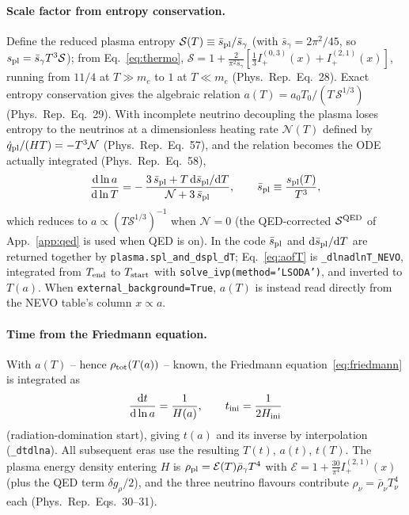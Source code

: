 \documentclass[11pt,a4paper]{article}
\newcommand{\dd}{\mathrm{d}}
\newcommand{\code}[1]{\texttt{#1}}
\newcommand{\PR}{Phys.\ Rep.}
\begin{document}
\paragraph{Scale factor from entropy conservation.}
Define the reduced plasma entropy $\mathcal{S}(T)\equiv\bar s_{\rm pl}/\bar
s_\gamma$ (with $\bar s_\gamma=2\pi^2/45$, so $s_{\rm pl}=\bar s_\gamma T^3
\mathcal{S}$); from Eq.~\eqref{eq:thermo}, $\mathcal{S}=1+\frac{2}{\pi^2\bar
s_\gamma}[\tfrac13 I^{(0,3)}_+(x)+I^{(2,1)}_+(x)]$, running from $11/4$ at $T\gg
m_e$ to $1$ at $T\ll m_e$ (\PR\ Eq.~28). Exact entropy conservation gives the
algebraic relation $a(T)=a_0T_0/(T\,\mathcal{S}^{1/3})$ (\PR\ Eq.~29). With
incomplete neutrino decoupling the plasma loses entropy to the neutrinos at a
dimensionless heating rate $\mathcal{N}(T)$ defined by $\dot q_{\rm pl}/(HT)=
-T^3\mathcal{N}$ (\PR\ Eq.~57), and the relation becomes the ODE actually
integrated (\PR\ Eq.~58),
\begin{equation}
  \frac{\dd\ln a}{\dd\ln T}
  = -\,\frac{3\,\bar s_{\rm pl}+T\,\dd\bar s_{\rm pl}/\dd T}
            {\mathcal{N}+3\,\bar s_{\rm pl}},
  \qquad \bar s_{\rm pl}\equiv \frac{s_{\rm pl}(T)}{T^3},
\label{eq:aofT}
\end{equation}
which reduces to $a\propto(T\mathcal{S}^{1/3})^{-1}$ when $\mathcal{N}=0$ (the
QED-corrected $\mathcal{S}^{\rm QED}$ of App.~\ref{app:qed} is used when QED is
on). In the code $\bar s_{\rm pl}$ and $\dd\bar s_{\rm pl}/\dd T$ are returned
together by \code{plasma.spl\_and\_dspl\_dT}; Eq.~\eqref{eq:aofT} is
\code{\_dlnadlnT\_NEVO}, integrated from $T_{\rm end}$ to $T_{\rm start}$ with
\code{solve\_ivp(method='LSODA')}, and inverted to $T(a)$. When
\code{external\_background=True}, $a(T)$ is instead read directly from the NEVO
table's column $x\propto a$.

\paragraph{Time from the Friedmann equation.}
With $a(T)$ -- hence $\rho_{\rm tot}(T(a))$ -- known, the Friedmann
equation~\eqref{eq:friedmann} is integrated as
\begin{equation}
  \frac{\dd t}{\dd\ln a}=\frac{1}{H(a)},
  \qquad t_{\rm ini}=\frac{1}{2H_{\rm ini}}
\end{equation}
(radiation-domination start), giving $t(a)$ and its inverse by interpolation
(\code{\_dtdlna}). All subsequent eras use the resulting $T(t)$, $a(t)$,
$t(T)$. The plasma energy density entering $H$ is
$\rho_{\rm pl}=\mathcal{E}(T)\bar\rho_\gamma T^4$ with
$\mathcal{E}=1+\tfrac{30}{\pi^4}I^{(2,1)}_+(x)$ (plus the QED term
$\delta g_\rho/2$), and the three neutrino flavours contribute
$\rho_\nu=\bar\rho_\nu T_\nu^4$ each (\PR\ Eqs.~30--31).
\end{document}

